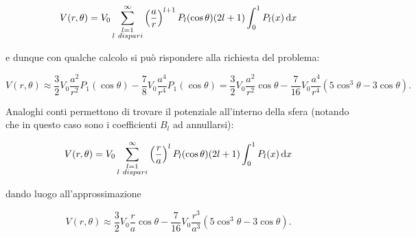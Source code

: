 \documentclass[../main.tex]{subfiles}
\begin{document}
\begin{equation*}
 V(r,\theta)=V_0\sum_{\substack{l=1\\ l\ dispari}}^{\infty}\left(\frac{a}{r}\right)^{l+1}P_l(\cos\theta)(2l+1)
 \int_{0}^1P_l(x)\de x
\end{equation*}

e dunque con qualche calcolo si può rispondere alla richiesta del problema:

$$V(r,\theta)\approx\frac{3}{2}V_0\frac{a^2}{r^2}P_1(\cos\theta)-\frac{7}{8}V_0\frac{a^4}{r^4}P_1(\cos\theta)=
\frac{3}{2}V_0\frac{a^2}{r^2}\cos\theta-\frac{7}{16}V_0\frac{a^4}{r^4}(5\cos^3\theta-3\cos\theta).$$

Analoghi conti permettono di trovare il potenziale all'interno della sfera (notando che in questo caso sono i coefficienti
$B_l$ ad annullarsi):

\begin{equation*}
 V(r,\theta)=V_0\sum_{\substack{l=1\\ l\ dispari}}^{\infty}\left(\frac{r}{a}\right)^lP_l(\cos\theta)(2l+1)\int_{0}^1P_l(x)
 \de x
\end{equation*}

dando luogo all'approssimazione

$$V(r,\theta)\approx\frac{3}{2}V_0\frac{r}{a}\cos\theta-\frac{7}{16}V_0\frac{r^3}{a^3}(5\cos^3\theta-3\cos\theta).$$
\end{document}

